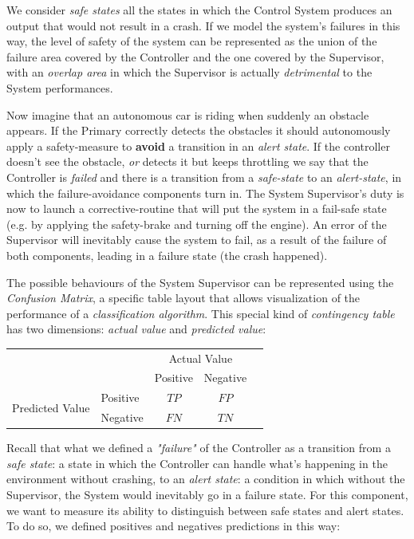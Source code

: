 We consider \textsl{safe states} all the states in which the Control System produces an output that would not result in a crash.
If we model the system's failures in this way, the level of safety of the system can be represented as the union of the failure area covered by the Controller and the one covered by the Supervisor, with an \textsl{overlap area} in which the Supervisor is actually \textsl{detrimental} to the System performances.

Now imagine that an autonomous car is riding when suddenly an obstacle appears. If the Primary correctly detects the obstacles it should autonomously apply a safety-measure to \textbf{avoid} a transition in an \textsl{alert state}. If the controller doesn't see the obstacle, \textsl{or} detects it but keeps throttling we say that the Controller is \textsl{failed} and there is a transition from a \textsl{safe-state} to an \textsl{alert-state}, in which the failure-avoidance components turn in. The System Supervisor's duty is now to launch a corrective-routine that will put the system in a fail-safe state (e.g. by applying the safety-brake and turning off the engine). An error of the Supervisor will inevitably cause the system to fail, as a result of the failure of both components, leading in a failure state (the crash happened). 

The possible behaviours of the System Supervisor can be represented using the \textsl{Confusion Matrix}, a specific table layout that allows visualization of the performance of a \textsl{classification algorithm}.\cite{wikiconfmatrix}\newline
This special kind of \textsl{contingency table} has two dimensions: \textsl{actual value} and \textsl{predicted value}:

\vspace{0.5cm}

\begin{tabular}{l|l|c|c|c}
	\multicolumn{2}{c}{}&\multicolumn{2}{c}{Actual Value}&\\
	\cline{3-4}
	\multicolumn{2}{c|}{}&Positive&Negative& \\
	\cline{2-4}
	\multirow{2}{*}{Predicted Value}& Positive & $TP$ & $FP$ & \\
	\cline{2-4}
	& Negative & $FN$ & $TN$ & \\
	\cline{2-4}
\end{tabular}

\vspace{0.8cm}

Recall that what we defined a \textsl{"failure"} of the Controller as a transition from a \textsl{safe state}: a state in which the Controller can handle what's happening in the environment without crashing, to an \textsl{alert state}: a condition in which without the Supervisor, the System would inevitably go in a failure state.
For this component, we want to measure its ability to distinguish between safe states and alert states. To do so, we defined positives and negatives predictions in this way:


